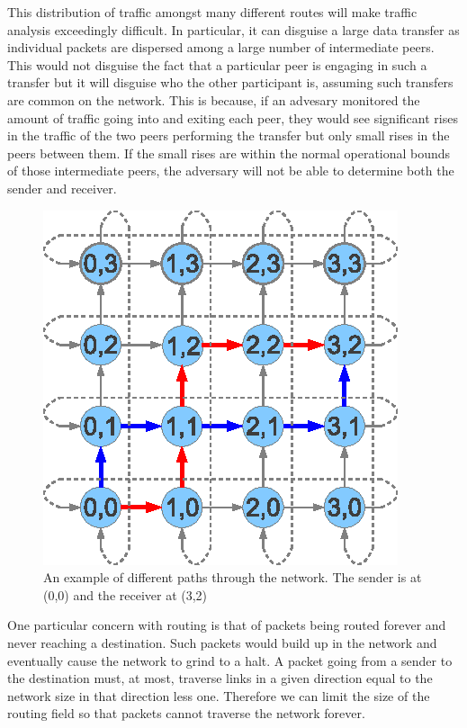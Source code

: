 \documentclass[ %
                    author={Luke Murray},
                supervisor={Dr. Simon Hollis},
                     title={Shadow Peer-to-Peer Networks},
                  subtitle={},
                    degree={MEng},
                      year={2013} ]{thesis}
\begin{document}
This distribution of traffic amongst many different routes will make traffic analysis exceedingly difficult. In particular, it can disguise a large data transfer as individual packets are dispersed among a large number of intermediate peers. This would not disguise the fact that a particular peer is engaging in such a transfer but it will disguise who the other participant is, assuming such transfers are common on the network. This is because, if an advesary monitored the amount of traffic going into and exiting each peer, they would see significant rises in the traffic of the two peers performing the transfer but only small rises in the peers between them. If the small rises are within the normal operational bounds of those intermediate peers, the adversary will not be able to determine both the sender and receiver.

\begin{figure}[h]
\centering
\includegraphics{diagrams/network_path.eps}
\caption{An example of different paths through the network. The sender is at (0,0) and the receiver at (3,2)}
\label{path}
\end{figure}

One particular concern with routing is that of packets being routed forever and never reaching a destination. Such packets would build up in the network and eventually cause the network to grind to a halt. A packet going from a sender to the destination must, at most, traverse links in a given direction equal to the network size in that direction less one. Therefore we can limit the size of the routing field so that packets cannot traverse the network forever.
\end{document}

